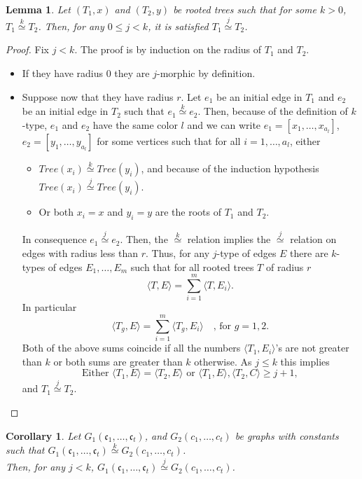 \documentclass[11pt,notitlepage,a4paper]{article}
\newtheorem{lemma}{Lemma}[section]
\newtheorem{corollary}{Corollary}[section]
\theoremstyle{definition}
\newcommand{\cc}{\mathfrak{c}}
\newcommand{\morph}[1]{\stackrel{#1}{\simeq}}
\begin{document}
\begin{lemma} \label{lem:lessktree}
	Let $(T_1,x)$ and $(T_2,y)$ be rooted trees such that for some $k>0$, 
	$T_1 \morph{k} T_2$. Then, for any $0\leq j < k$, it is satisfied
	$T_1 \morph{j} T_2$.
\end{lemma}
\begin{proof}
	Fix $j<k$. The proof is by induction on the radius of $T_1$ and $T_2$.
	\begin{itemize}[leftmargin=*]
		\item If they have radius $0$ they are $j$-morphic by definition. 
		\item Suppose now that they have radius $r$. Let $e_1$ be an initial edge 
		in $T_1$ and $e_2$ be an initial edge in $T_2$ such that $e_1 \morph{k} e_2$.
		Then, because of the definition of $k$-type,
		$e_1$ and $e_2$ have the same color $l$ and we can write
		$e_1=[x_1,\dots,x_{a_l}]$,
		$e_2=[y_1,\dots,y_{a_l}]$ for some vertices such that for all
		$i=1,\dots, a_l$, either 
		\begin{itemize}
			\item $Tree(x_i)\morph{k} Tree(y_i)$, and because of the induction hypothesis $Tree(x_i)\morph{j} Tree(y_i)$. 
			\item Or both $x_i=x$ and $y_i=y$ are the roots of $T_1$ and $T_2$.
		\end{itemize}
		In consequence $e_1\morph{j} e_2$. Then, the $\morph{k}$ relation
		implies the $\morph{j}$ relation on edges with radius less than $r$.
		Thus, for any $j$-type of edges $E$ there are 
		$k$-types of edges $E_1, \dots, E_m$ such that for all rooted trees $T$ of radius $r$
		\[ \langle T,E\rangle = \sum_{i=1}^{m} \langle T,E_i \rangle .\]
		In particular
		\[\langle T_g , E\rangle =\sum_{i=1}^m \langle T_g, E_i \rangle 
		\quad \text{, for } 	g=1,2.\]	
	 	Both of the above sums coincide if all the numbers
	 	$\langle T_1, E_i\rangle$'s are not greater than $k$ or
	 	both sums are greater than $k$ otherwise. As $j\leq k$ this implies
	 	\[\text{Either }\langle T_1, E \rangle =\langle T_2,E \rangle \text{ or } \langle T_1,E \rangle ,\langle T_2,C \rangle \geq j+1 ,\]
	 	and $T_1\morph{j}T_2$. 		
	\end{itemize}
\end{proof}	


\begin{corollary}
	Let $G_1(\cc_1,\dots, \cc_t)$, and $G_2(c_1,\dots,c_t)$ be graphs
	with constants such that $G_1(\cc_1,\dots, \cc_t)\morph{k}G_2(c_1,\dots,c_t)$.
	\\
	Then, for any $j<k$, $G_1(\cc_1,\dots, \cc_t)\morph{j}G_2(c_1,\dots,c_t)$.
\end{corollary}
\end{document}
